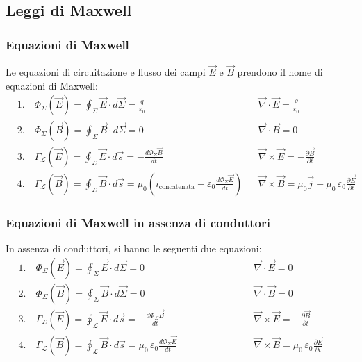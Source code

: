 \documentclass[a4paper]{article}
\newcommand\nab{\vec{\nabla}} %
\begin{document}
\subsection{Leggi di Maxwell}
\subsubsection*{Equazioni di Maxwell}
Le equazioni di circuitazione e flusso dei campi \(\vec{E}\) e \(\vec{B}\) prendono il nome di equazioni di Maxwell:
\begin{align*}
	&1. \quad \Phi_\Sigma(\vec{E}) = \oint_\Sigma \vec{E} \cdot d\vec{\Sigma} = \frac{q}{\varepsilon_0} 
	&& \nab \cdot \vec{E} = \frac{\rho}{\varepsilon_0} \\
	&2. \quad \Phi_\Sigma(\vec{B}) = \oint_\Sigma \vec{B} \cdot d \vec{\Sigma} = 0 
	&& \nab \cdot \vec{B} = 0 \\
	&3. \quad \Gamma_\mathcal{L}(\vec{E}) = \oint_\mathcal{L} \vec{E} \cdot d\vec{s} = - \frac{d\Phi_\Sigma \vec{B}}{dt}
	&& \nab \times \vec{E} = - \frac{\partial \vec{B}}{\partial t} \\
	&4. \quad \Gamma_\mathcal{L}(\vec{B}) = \oint_\mathcal{L} \vec{B} \cdot d\vec{s} = \mu_0 (i_\text{concatenata} + \varepsilon_0 \frac{d \Phi_\Sigma \vec{E}}{dt})
	&& \nab \times \vec{B} = \mu_0 \vec{j} + \mu_0 \, \varepsilon_0 \frac{\partial \vec{E}}{\partial t}
\end{align*}

\subsubsection*{Equazioni di Maxwell in assenza di conduttori}
In assenza di conduttori, si hanno le seguenti due equazioni:
\begin{align*}
	&1. \quad \Phi_\Sigma(\vec{E}) = \oint_\Sigma \vec{E} \cdot d\vec{\Sigma} = 0
	&& \nab \cdot \vec{E} = 0\\
	&2. \quad \Phi_\Sigma(\vec{B}) = \oint_\Sigma \vec{B} \cdot d \vec{\Sigma} = 0 
	&& \nab \cdot \vec{B} = 0 \\
	&3. \quad \Gamma_\mathcal{L}(\vec{E}) = \oint_\mathcal{L} \vec{E} \cdot d\vec{s} = - \frac{d\Phi_\Sigma \vec{B}}{dt}
	&& \nab \times \vec{E} = - \frac{\partial \vec{B}}{\partial t} \\
	&4. \quad \Gamma_\mathcal{L}(\vec{B}) = \oint_\mathcal{L} \vec{B} \cdot d\vec{s} = \mu_0 \, \varepsilon_0 \frac{d \Phi_\Sigma \vec{E}}{dt} \qquad\qquad\qquad\;
	&& \nab \times \vec{B} = \mu_0 \, \varepsilon_0 \frac{\partial \vec{E}}{\partial t} \qquad\;\;\;
\end{align*}
\end{document}
